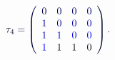 \documentclass[12pt]{article}
\begin{document}
\makeatletter
\renewcommand*{\@textcolor}[3]{%
  \protect\leavevmode
  \begingroup
    \color#1{#2}#3%
  \endgroup
}
\makeatother
\begin{displaymath}
\mathcolor[RGB]{0,0,15}{\tau} _ { \mathcolor[RGB]{0,0,30}{4} } \mathcolor[RGB]{0,0,45}{=} \mathcolor[RGB]{0,0,60}{\left(} \begin{array} {ccccccc} { \mathcolor[RGB]{0,0,75}{0} } & { \mathcolor[RGB]{0,0,90}{0} } & { \mathcolor[RGB]{0,0,105}{0} } & { \mathcolor[RGB]{0,0,120}{0} } \\ { \mathcolor[RGB]{0,0,135}{1} } & { \mathcolor[RGB]{0,0,150}{0} } & { \mathcolor[RGB]{0,0,165}{0} } & { \mathcolor[RGB]{0,0,180}{0} } \\ { \mathcolor[RGB]{0,0,195}{1} } & { \mathcolor[RGB]{0,0,210}{1} } & { \mathcolor[RGB]{0,0,225}{0} } & { \mathcolor[RGB]{0,0,240}{0} } \\ { \mathcolor[RGB]{0,0,255}{1} } & { \mathcolor[RGB]{0,15,0}{1} } & { \mathcolor[RGB]{0,15,15}{1} } & { \mathcolor[RGB]{0,15,30}{0} } \end{array} \mathcolor[RGB]{0,15,45}{\right)} \mathcolor[RGB]{0,15,60}{.}
\end{displaymath}
\end{document}
